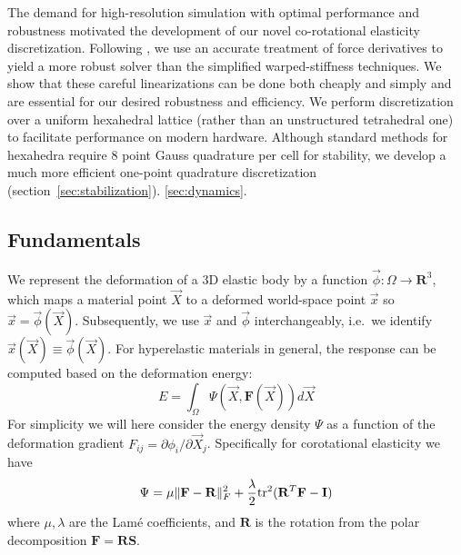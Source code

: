 The  demand for high-resolution simulation with optimal
performance and robustness motivated the development of our novel co-rotational
elasticity discretization. Following \cite{Chao:2010:SGM}, we use an accurate
treatment of force derivatives to yield a more robust solver than the
simplified warped-stiffness techniques. We show that these careful
linearizations can be done both cheaply and simply and are essential for our desired
robustness and efficiency. We perform  discretization over a
uniform hexahedral lattice  (rather than an unstructured tetrahedral one) to
facilitate performance on modern hardware. Although standard methods for
hexahedra require 8 point Gauss quadrature per cell for stability, we develop a
much more efficient one-point quadrature discretization
(section~\ref{sec:stabilization}).  \ref{sec:dynamics}.

\subsection{Fundamentals}
\label{sec:fundamentals}

We represent the deformation of a 3D elastic body by a function $\vec{\phi}:\Omega\rightarrow\mathbf{R}^3$, which maps a material point
$\vec{X}$ to a deformed world-space point $\vec{x}$ so $\vec{x}=\vec{\phi}(\vec{X})$. Subsequently, we use $\vec{x}$ and $\vec{\phi}$ interchangeably,
i.e.\ we identify $\vec{x}(\vec{X})\equiv\vec{\phi}(\vec{X})$. For hyperelastic
materials in general, the response can be computed based on the deformation energy:
\begin{equation}
E=\int_\Omega\Psi(\vec{X},\mathbf{F}(\vec{X}))d\vec{X}
\label{eqn_energy_integral}
\end{equation}
For simplicity we will here consider the energy density $\Psi$ as a function of the
deformation gradient $F_{ij}=\partial\phi_i/\partial\vec{X}_j$. Specifically for
corotational elasticity we have
\begin{equation}
\Psi=\mu\|\mathbf{F}-\mathbf{R}\|_F^2+\frac{\lambda}{2}\mbox{tr}^2(\mathbf{R}^T\mathbf{F}-\mathbf{I})
\label{eqn_energy_F}
\end{equation}
where $\mu,\lambda$ are the Lam\'{e} coefficients, and $\mathbf{R}$ is the rotation from the polar decomposition $\mathbf{F}=\mathbf{RS}$.

